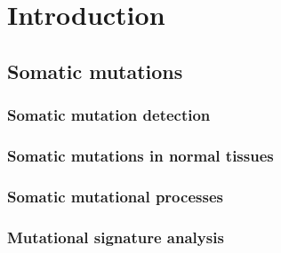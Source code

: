 
\chapter{Introduction}  %

\ifpdf
    \graphicspath{{Chapter1/Figs/Raster/}{Chapter1/Figs/PDF/}{Chapter1/Figs/}}
\else
    \graphicspath{{Chapter1/Figs/Vector/}{Chapter1/Figs/}}
\fi



\section{Somatic mutations}


\subsection{Somatic mutation detection}

\subsection{Somatic mutations in normal tissues}

\subsection{Somatic mutational processes}

\subsection{Mutational signature analysis}



